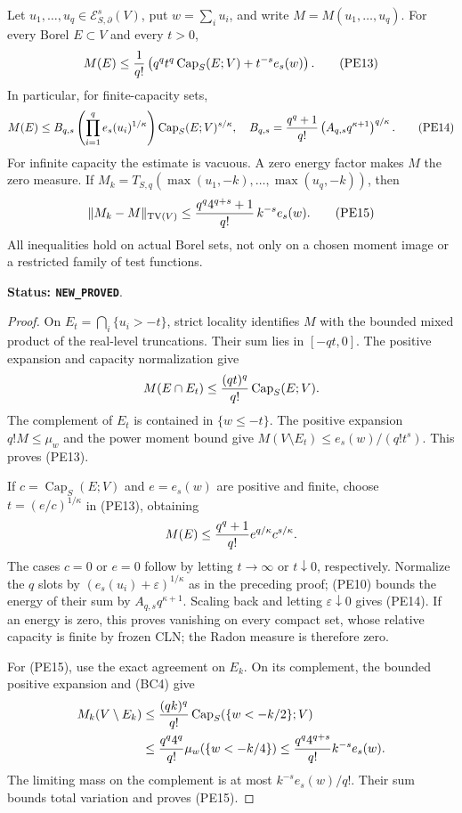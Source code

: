 \begin{proposition}
\label{prop:r11-power-capacity-domination}
Let $u_1,\ldots,u_q\in\mathcal E^s_{S,\partial}(V)$, put
$w=\sum_i u_i$, and write $M=M(u_1,\ldots,u_q)$.
For every Borel $E\subset V$ and every $t>0$,
\[
 M(E)\leq{1\over q!}
       \left(q^qt^q\operatorname{Cap}_S(E;V)+t^{-s}e_s(w)\right).
 \tag{PE13}
\]
In particular, for finite-capacity sets,
\[
 M(E)\leq B_{q,s}
       \left(\prod_{i=1}^q e_s(u_i)^{1/\kappa}\right)
                    \operatorname{Cap}_S(E;V)^{s/\kappa},
 \quad
 B_{q,s}={q^q+1\over q!}
                  \left(A_{q,s}q^{\kappa+1}\right)^{q/\kappa}.
 \tag{PE14}
\]
For infinite capacity the estimate is vacuous. A zero energy
factor makes $M$ the zero measure.
If $M_k=T_{S,q}(\max(u_1,-k),\ldots,\max(u_q,-k))$, then
\[
 \|M_k-M\|_{\mathrm{TV}(V)}
       \leq {q^q4^{q+s}+1\over q!}\,k^{-s}e_s(w).
 \tag{PE15}
\]
All inequalities hold on actual Borel sets, not only on a chosen
moment image or a restricted family of test functions.
\end{proposition}

\noindent\textbf{Status: \texttt{NEW\_PROVED}}.

\begin{proof}
On $E_t=\bigcap_i\{u_i>-t\}$, strict locality identifies $M$
with the bounded mixed product of the real-level truncations.
Their sum lies in $[-qt,0]$. The positive expansion and capacity
normalization give
\[
                         M(E\cap E_t)
                        \leq{(qt)^q\over q!}\operatorname{Cap}_S(E;V).
\]
The complement of $E_t$ is contained in $\{w\leq-t\}$.
The positive expansion $q!M\leq\mu_w$ and the power moment
bound give $M(V\setminus E_t)\leq e_s(w)/(q!t^s)$.
This proves (PE13).

If $c=\operatorname{Cap}_S(E;V)$ and $e=e_s(w)$ are positive
and finite, choose $t=(e/c)^{1/\kappa}$ in (PE13), obtaining
\[
                   M(E)\leq{q^q+1\over q!}
                                   e^{q/\kappa}c^{s/\kappa}.
\]
The cases $c=0$ or $e=0$ follow by letting $t\to\infty$ or
$t\downarrow0$, respectively. Normalize the $q$ slots by
$(e_s(u_i)+\varepsilon)^{1/\kappa}$ as in the preceding proof;
(PE10) bounds the energy of their sum by
$A_{q,s}q^{\kappa+1}$. Scaling back and letting
$\varepsilon\downarrow0$ gives (PE14). If an energy is zero,
this proves vanishing on every compact set, whose relative
capacity is finite by frozen CLN; the Radon measure is therefore
zero.

For (PE15), use the exact agreement on $E_k$. On its complement,
the bounded positive expansion and (BC4) give
\[
 \begin{split}
 M_k(V\setminus E_k)
  &\leq{(qk)^q\over q!}\operatorname{Cap}_S(\{w<-k/2\};V)\\
  &\leq{q^q4^q\over q!}\mu_w(\{w<-k/4\})
   \leq{q^q4^{q+s}\over q!}k^{-s}e_s(w).
 \end{split}
\]
The limiting mass on the complement is at most
$k^{-s}e_s(w)/q!$. Their sum bounds total variation and proves
(PE15).
\end{proof}

